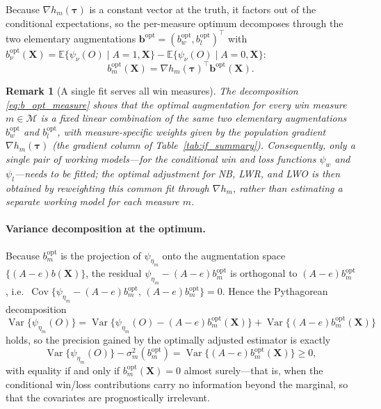 \documentclass[11pt,a4paper]{article}
\newtheorem{remark}{Remark}
\newcommand{\E}{\mathbb{E}}
\newcommand{\Var}{\operatorname{Var}}
\newcommand{\Cov}{\operatorname{Cov}}
\begin{document}
Because $\nabla h_m(\boldsymbol\tau)$ is a constant vector at the truth, it factors out of
the conditional expectations, so the per-measure optimum decomposes through the two
elementary augmentations
$\boldsymbol b^{\mathrm{opt}}=(b_w^{\mathrm{opt}},b_l^{\mathrm{opt}})^\top$ with
$b_\nu^{\mathrm{opt}}(\mathbf X)=\E\{\psi_\nu(O)\mid A=1,\mathbf X\}-\E\{\psi_\nu(O)\mid A=0,\mathbf X\}$:
\begin{equation}\label{eq:b_opt_measure}
   b_m^{\mathrm{opt}}(\mathbf X)=\nabla h_m(\boldsymbol\tau)^\top\boldsymbol b^{\mathrm{opt}}(\mathbf X).
\end{equation}

\begin{remark}[A single fit serves all win measures]
\label{rmk:shared_fit}
The decomposition \eqref{eq:b_opt_measure} shows that the optimal augmentation for every
win measure $m\in\mathcal{M}$ is a fixed linear combination of the same two elementary augmentations
$b_w^{\mathrm{opt}}$ and $b_l^{\mathrm{opt}}$, with measure-specific weights given by the
population gradient $\nabla h_m(\boldsymbol\tau)$ (the gradient column of
Table~\ref{tab:if_summary}). Consequently, only a single pair of working models---for the conditional win and loss functions $\psi_w$ and $\psi_l$---needs to be fitted; the optimal adjustment for NB, LWR, and LWO is then obtained by reweighting this common fit through $\nabla h_m$, rather than estimating a separate working model for each measure $m$.
\end{remark}

\paragraph{Variance decomposition at the optimum.}
Because $b_m^{\mathrm{opt}}$ is the projection of $\psi_{\eta_m}$ onto the augmentation
space $\{(A-e)b(\mathbf X)\}$, the residual $\psi_{\eta_m}-(A-e)b_m^{\mathrm{opt}}$ is
orthogonal to $(A-e)b_m^{\mathrm{opt}}$, i.e.\
$\Cov\{\psi_{\eta_m}-(A-e)b_m^{\mathrm{opt}},\,(A-e)b_m^{\mathrm{opt}}\}=0$. Hence the
Pythagorean decomposition
\[
   \Var\{\psi_{\eta_m}(O)\}
   =\Var\{\psi_{\eta_m}(O)-(A-e)b_m^{\mathrm{opt}}(\mathbf X)\}
   +\Var\{(A-e)b_m^{\mathrm{opt}}(\mathbf X)\}
\]
holds, so the precision gained by the optimally adjusted estimator is exactly
\[
   \Var\{\psi_{\eta_m}(O)\}-\sigma_m^2(b_m^{\mathrm{opt}})
   =\Var\{(A-e)b_m^{\mathrm{opt}}(\mathbf X)\}\ge 0,
\]
with equality if and only if $b_m^{\mathrm{opt}}(\mathbf X)=0$ almost surely---that is,
when the conditional win/loss contributions carry no information beyond the marginal, so
that the covariates are prognostically irrelevant.
\end{document}
